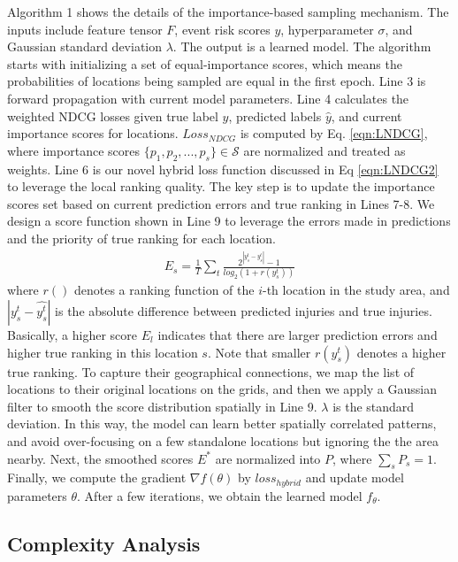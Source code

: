 \documentclass{article}
\def \S {\mathbf{S}}
\def \S {\mathcal{S}}
\begin{document}
Algorithm 1 shows the details of the importance-based sampling mechanism. The inputs include feature tensor $F$, event risk scores $y$, hyperparameter $\sigma$, and Gaussian standard deviation $\lambda$. The output is a learned model. The algorithm starts with initializing a set of equal-importance scores, which means the probabilities of locations being sampled are equal in the first epoch. Line 3 is forward propagation with current model parameters. Line 4 calculates the weighted NDCG losses given true label $y$, predicted labels $\hat{y}$, and current importance scores for locations. $Loss_{NDCG}$ is computed by Eq. \ref{eqn:LNDCG}, where importance scores $\{p_1, p_2, ..., p_s\} \in \S $ are normalized and treated as weights. Line 6 is our novel hybrid loss function discussed in Eq \ref{eqn:LNDCG2} to leverage the local ranking quality. The key step is to update the importance scores set based on current prediction errors and true ranking in Lines 7-8. We design a score function shown in Line 9 to leverage the errors made in predictions and the priority of true ranking for each location.
\begin{align}
E_s = \frac{1}{T} \sum_{t}{\frac{2^{|y_s^t-\hat{y_s^t}|} - 1}{ log_{2}{(1+r(y_s^t))}}}
\end{align}
where $r()$ denotes a ranking function of the $i$-th location in the study area, and $|y_s^t-\hat{y_s^t}|$ is the absolute difference between predicted injuries and true injuries. Basically, a higher score $E_l$ indicates that there are larger prediction errors and higher true ranking in this location $s$. Note that smaller $r(y_s^t)$ denotes a higher true ranking. To capture their geographical connections, we map the list of locations to their original locations on the grids, and then we apply a Gaussian filter to smooth the score distribution spatially in Line 9. $\lambda$ is the standard deviation. In this way, the model can learn better spatially correlated patterns, and avoid over-focusing on a few standalone locations but ignoring the the area nearby. Next, the smoothed scores $E^*$ are normalized into $P$, where $\sum_s P_s = 1$. Finally, we compute the gradient $\nabla f(\theta)$ by $loss_{hybrid}$ and update model parameters $\theta$. After a few iterations, we obtain the learned model $f_\theta{}$.

\subsection{Complexity Analysis}
\end{document}

